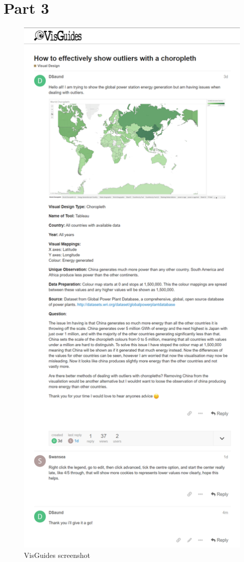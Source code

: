 \documentclass{article}
\begin{document}
\section*{Part 3}

\begin{figure}[ht]
\centering
\includegraphics[scale=0.25]{VisGuides.png}
\caption{VisGuides screenshot}
\end{figure}
\end{document}
